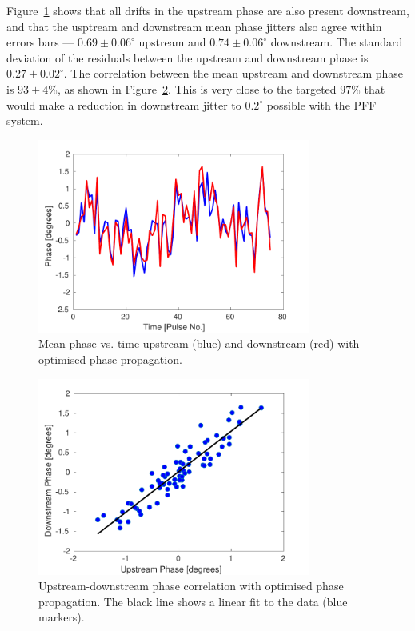 Figure~\ref{f:bestProp_meanPhase} shows that all drifts in the upstream phase are also present downstream, and that the usptream and downstream mean phase jitters also agree within errors bars --- \(0.69\pm0.06^\circ\) upstream and \(0.74\pm0.06^\circ\) downstream. The standard deviation of the residuals between the upstream and downstream phase is \(0.27\pm0.02^\circ\).%
The correlation between the mean upstream and downstream phase is \(93\pm4\%\), as shown in Figure~\ref{f:bestProp_meanCorr}. This is very close to the targeted \(97\%\) that would make a reduction in downstream jitter to \(0.2^\circ\) possible with the PFF system.

\begin{figure}
  \centering
  \includegraphics[width=0.8\textwidth]{Figures/propagation/bestProp_meanPhase}
  \caption{Mean phase vs. time upstream (blue) and downstream (red) with optimised phase propagation.}
  \label{f:bestProp_meanPhase}
\end{figure}

\begin{figure}
  \centering
  \includegraphics[width=0.8\textwidth]{Figures/propagation/bestProp_meanCorr}
  \caption{Upstream-downstream phase correlation with optimised phase propagation. The black line shows a linear fit to the data (blue markers).}
  \label{f:bestProp_meanCorr}
\end{figure}

